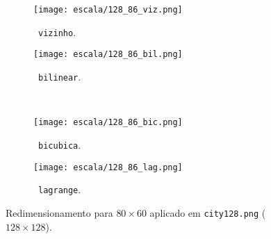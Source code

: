 \begin{figure}[H]
    \centering
    \begin{subfigure}{0.33\textwidth}
        \centering
        \texttt{[image: escala/128\_86\_viz.png]}
        \caption{~\texttt{vizinho}.}
    \end{subfigure}%
    \hspace{8pt}
    \begin{subfigure}{0.33\textwidth}
        \centering
        \texttt{[image: escala/128\_86\_bil.png]}
        \caption{~\texttt{bilinear}.}
    \end{subfigure}
    \\[8pt]
    \begin{subfigure}{0.33\textwidth}
        \centering
        \texttt{[image: escala/128\_86\_bic.png]}
        \caption{~\texttt{bicubica}.}
    \end{subfigure}%
    \hspace{8pt}%
    \begin{subfigure}{0.33\textwidth}
        \centering
        \texttt{[image: escala/128\_86\_lag.png]}
        \caption{~\texttt{lagrange}.}
    \end{subfigure}

    \caption{Redimensionamento para $80 \times 60$ aplicado em \texttt{city128.png} ($128 \times 128$).}
    \label{fig:esc:86}
\end{figure}